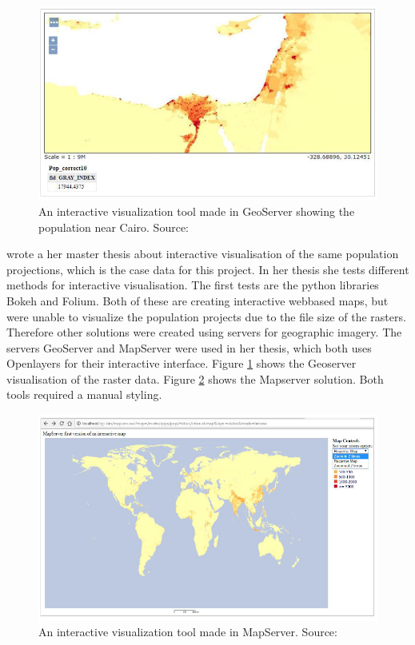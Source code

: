 \begin{figure} [H]
	\centering
	\includegraphics[width=.8\textwidth]{Pictures/Geoserver}
	\caption{An interactive visualization tool made in GeoServer showing the population near Cairo. Source: \citet{Sarah}}
	\label{Geoserver}
\end{figure}

\citet{Sarah} wrote a her master thesis about interactive visualisation of the same population projections, which is the case data for this project. In her thesis she tests different methods for interactive visualisation. The first tests are the python libraries Bokeh and Folium. Both of these are creating interactive webbased maps, but were unable to visualize the population projects due to the file size of the rasters. Therefore other solutions were created using servers for geographic imagery. The servers GeoServer and MapServer were used in her thesis, which both uses Openlayers for their interactive interface. Figure \ref{Geoserver} shows the Geoserver visualisation of the raster data. Figure \ref{Mapserver} shows the Mapserver solution. Both tools required a manual styling.

\begin{figure} [H]
	\centering
	\includegraphics[width=1\textwidth]{Pictures/Mapserver}
	\caption{An interactive visualization tool made in MapServer. Source: \citet{Sarah}}
	\label{Mapserver}
\end{figure}

